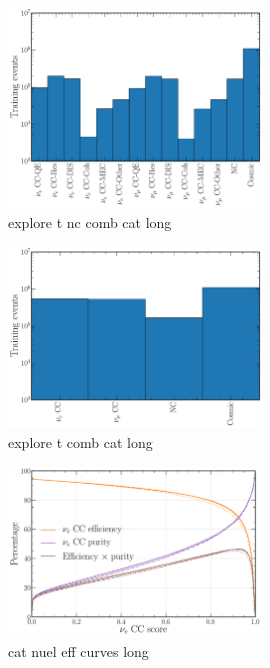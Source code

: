 \begin{figure} %
    \includegraphics[width=0.6\textwidth]{diagrams/6-cvn/chipsnet/explore_t_nc_comb_cat.pdf}
    \caption[explore t nc comb cat short]
    {explore t nc comb cat long}
    \label{fig:explore_t_nc_comb_cat}
\end{figure}

\begin{figure} %
    \includegraphics[width=0.6\textwidth]{diagrams/6-cvn/chipsnet/explore_t_comb_cat.pdf}
    \caption[explore t comb cat short]
    {explore t comb cat long}
    \label{fig:explore_t_comb_cat}
\end{figure}

\begin{figure} %
    \includegraphics[width=0.6\textwidth]{diagrams/6-cvn/chipsnet/cat_nuel_eff_curves.pdf}
    \caption[cat nuel eff curves short]
    {cat nuel eff curves long}
    \label{fig:cat_nuel_eff_curves}
\end{figure}

